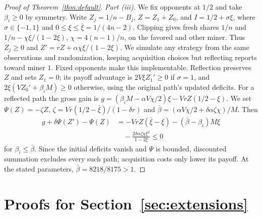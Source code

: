 \documentclass[sigconf,anonymous,review]{acmart}
\numberwithin{equation}{section}
\begin{document}
\begin{proof}[Proof of Theorem~\ref{thm:default}]
\emph{Part (iii).} We fix opponents at $1/2$ and take $\beta_i\ge0$ by
symmetry. Write $Z_j=1/n-B_j$, $Z=Z_1+Z_0$, and $I=1/2+\sigma\xi$, where
$\sigma\in\{-1,1\}$ and $0\le\xi\le\bar\xi=1/(4n-2)$. Clipping gives fresh
shares $1/n$ and $1/n-\chi\xi/(1-2\xi)$, $\chi=4(n-1)/n$, on the favored
and other miner. Thus $Z_j\ge0$ and $Z'=rZ+\alpha\chi\xi/(1-2\xi)$.
We simulate any strategy from the same observations and randomization,
keeping acquisition choices but reflecting reports toward miner $1$.
Fixed opponents make this implementable. Reflection preserves $Z$ and sets
$Z_1=0$; its payoff advantage is
$2V\xi Z_1'\ge0$ if $\sigma=1$, and $2\xi(VZ_0'+\beta_iM)\ge0$ otherwise,
using the original path's updated deficits. For a reflected path the gross
gain is $g=(\beta_iM-\alpha V\chi/2)\xi-VrZ(1/2-\xi)$.
We set $\Psi(Z)=-\zeta Z$, $\zeta=Vr(1/2-\bar\xi)/(1-\delta r)$ and
$\bar\beta=(\alpha V\chi/2+\delta\alpha\zeta\chi)/M$. Then
\begin{align*}
g+\delta\Psi(Z')-\Psi(Z)
&=-VrZ(\bar\xi-\xi)-(\bar\beta-\beta_i)M\xi\\
&\quad-\frac{2\delta\alpha\zeta\chi\xi^2}{1-2\xi}\le0
\end{align*}
for $\beta_i\le\bar\beta$. Since the initial deficits vanish and $\Psi$ is
bounded, discounted summation excludes every such path; acquisition costs
only lower its payoff. At the stated parameters,
$\bar\beta=8218/8175>1$.\qedhere
\end{proof}

\section{Proofs for Section~\ref{sec:extensions}}
\label{app:extensions}
\end{document}

